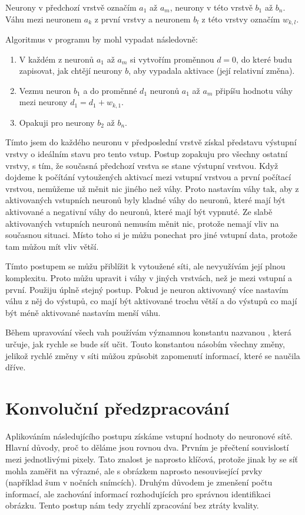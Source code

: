 \documentclass[12pt,a4paper]{report}
\begin{document}
	Neurony v předchozí vrstvě označím $a_1$ až $a_m$, neurony v této vrstvě $b_1$ až $b_n$. Váhu mezi neuronem $a_k$ z první vrstvy a neuronem $b_l$ z této vrstvy označím $w_{k,l}$.
	
	Algoritmus v programu by mohl vypadat následovně:
	\begin{enumerate}
		\item V každém z neuronů $a_1$ až $a_m$ si vytvořím proměnnou $d=0$, do které budu zapisovat, jak chtějí neurony $b$, aby vypadala aktivace (její relativní změna).
		\item Vezmu neuron $b_1$ a do proměnné $d_1$ neuronů $a_1$ až $a_m$ připíšu hodnotu váhy mezi neurony $d_1=d_1+w_{k,1}$.
		\item Opakuji pro neurony $b_2$ až $b_n$.
	\end{enumerate}
	Tímto jsem do každého neuronu v předposlední vrstvě získal představu výstupní vrstvy o ideálním stavu pro tento vstup. Postup zopakuju pro všechny ostatní vrstvy, s tím, že současná předchozí vrstva se stane výstupní vrstvou. Když dojdeme k počítání vytoužených aktivací mezi vstupní vrstvou a první počítací vrstvou, nemůžeme už měnit nic jiného než váhy. Proto nastavím váhy tak, aby z aktivovaných vstupních neuronů byly kladné váhy do neuronů, které mají být aktivované a negativní váhy do neuronů, které mají být vypnuté. Ze slabě aktivovaných vstupních neuronů nemusím měnit nic, protože nemají vliv na současnou situaci. Místo toho si je můžu ponechat pro jiné vstupní data, protože tam můžou mít vliv větší.
	
	Tímto postupem se můžu přiblížit k vytoužené síti, ale nevyužívám její plnou komplexitu. Proto můžu upravit i váhy v jiných vrstvách, než je mezi vstupní a první. Použiju úplně stejný postup. Pokud je neuron aktivovaný více nastavím váhu z něj do výstupů, co mají být aktivované trochu větší a do výstupů co mají být méně aktivované nastavím menší váhu.
	
	Během upravování všech vah používám významnou konstantu nazvanou , která určuje, jak rychle se bude síť učit. Touto konstantou násobím všechny změny, jelikož rychlé změny v síti můžou způsobit zapomenutí informací, které se naučila dříve.
	
\chapter{Konvoluční předzpracování}
Aplikováním následujícího postupu získáme vstupní hodnoty do neuronové sítě. Hlavní důvody, proč to děláme jsou rovnou dva. Prvním je přečtení souvislostí mezi jednotlivými pixely. Tato znalost je naprosto klíčová, protože jinak by se síť mohla zaměřit na výrazné, ale s obrázkem naprosto nesouvisející prvky (například šum v nočních snímcích). Druhým důvodem je zmenšení počtu informací, ale zachování informací rozhodujících pro správnou identifikaci obrázku. Tento postup nám tedy zrychlí zpracování bez ztráty kvality.
\end{document}
